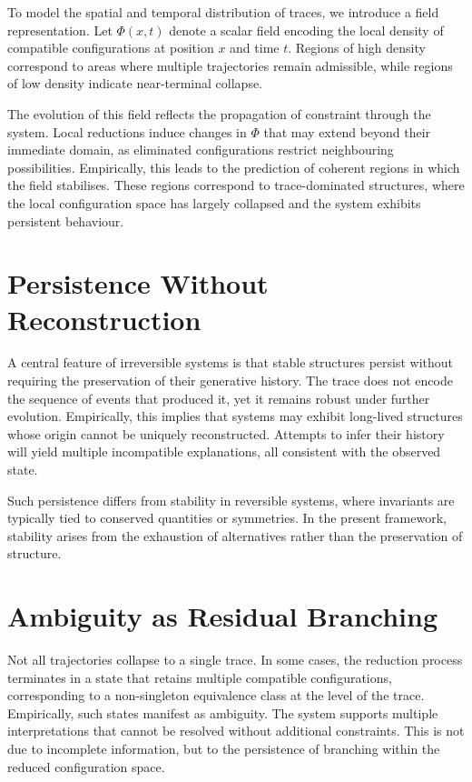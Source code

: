 \documentclass[12pt, oneside]{amsbook}
\theoremstyle{plain}
\theoremstyle{definition}
\theoremstyle{remark}
\newcommand{\RSVPfield}{\Phi}
\begin{document}
To model the spatial and temporal distribution of traces, we introduce a field
representation. Let $\RSVPfield(x,t)$ denote a scalar field encoding the local
density of compatible configurations at position $x$ and time $t$. Regions of
high density correspond to areas where multiple trajectories remain admissible,
while regions of low density indicate near-terminal collapse.

The evolution of this field reflects the propagation of constraint through the
system. Local reductions induce changes in $\RSVPfield$ that may extend beyond
their immediate domain, as eliminated configurations restrict neighbouring
possibilities. Empirically, this leads to the prediction of coherent regions in
which the field stabilises. These regions correspond to trace-dominated
structures, where the local configuration space has largely collapsed and the
system exhibits persistent behaviour.

\section{Persistence Without Reconstruction}
\label{sec:empirical:persistence}

A central feature of irreversible systems is that stable structures persist
without requiring the preservation of their generative history. The trace does
not encode the sequence of events that produced it, yet it remains robust under
further evolution. Empirically, this implies that systems may exhibit long-lived
structures whose origin cannot be uniquely reconstructed. Attempts to infer
their history will yield multiple incompatible explanations, all consistent with
the observed state.

Such persistence differs from stability in reversible systems, where invariants
are typically tied to conserved quantities or symmetries. In the present
framework, stability arises from the exhaustion of alternatives rather than the
preservation of structure.

\section{Ambiguity as Residual Branching}
\label{sec:empirical:ambiguity}

Not all trajectories collapse to a single trace. In some cases, the reduction
process terminates in a state that retains multiple compatible configurations,
corresponding to a non-singleton equivalence class at the level of the trace.
Empirically, such states manifest as ambiguity. The system supports multiple
interpretations that cannot be resolved without additional constraints. This is
not due to incomplete information, but to the persistence of branching within
the reduced configuration space.
\end{document}
